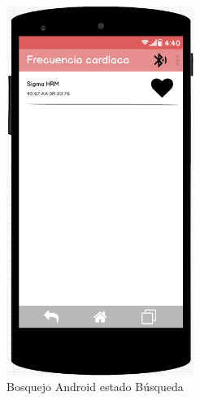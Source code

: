\begin{figure}[h]
\begin{minipage}{0.45\textwidth}
   \includegraphics[height=12cm]{graphs/mockup_android_searching_es.png} \caption{Bosquejo Android estado Búsqueda}\label{fig:mockup:busqueda}
 \end{minipage}
\end{figure}

